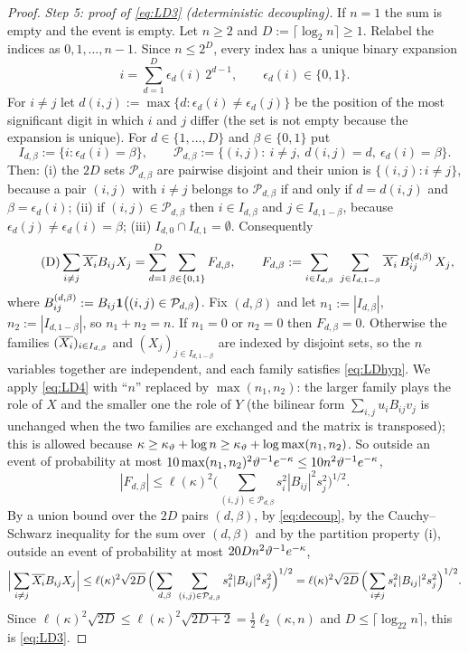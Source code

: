 \begin{proof}
\emph{Step 5: proof of \eqref{eq:LD3} (deterministic decoupling).} If $n=1$ the sum is empty and the event is empty. Let $n\ge2$ and $D:=\lceil\log_2n\rceil\ge1$. Relabel the indices as $0,1,\dots,n-1$. Since $n\le2^D$, every index has a unique binary expansion
\[
 i=\sum_{d=1}^D\epsilon_d(i)\,2^{d-1},\qquad\epsilon_d(i)\in\{0,1\}.
\]
For $i\ne j$ let $d(i,j):=\max\{d:\epsilon_d(i)\ne\epsilon_d(j)\}$ be the position of the most significant digit in which $i$ and $j$ differ (the set is not empty because the expansion is unique).
For $d\in\{1,\dots,D\}$ and $\beta\in\{0,1\}$ put
\[
 I_{d,\beta}:=\{i:\epsilon_d(i)=\beta\},\qquad\mathcal P_{d,\beta}:=\{(i,j):\ i\ne j,\ d(i,j)=d,\ \epsilon_d(i)=\beta\}.
\]
Then: (i) the $2D$ sets $\mathcal P_{d,\beta}$ are pairwise disjoint and their union is $\{(i,j):i\ne j\}$, because a pair $(i,j)$ with $i\ne j$ belongs to $\mathcal P_{d,\beta}$ if and only if $d=d(i,j)$ and $\beta=\epsilon_d(i)$;
(ii) if $(i,j)\in\mathcal P_{d,\beta}$ then $i\in I_{d,\beta}$ and $j\in I_{d,1-\beta}$, because $\epsilon_d(j)\ne\epsilon_d(i)=\beta$; (iii) $I_{d,0}\cap I_{d,1}=\emptyset$. Consequently
\begin{equation}\tag{D}\label{eq:decoup}
 \sum_{i\ne j}\overline{X_i}B_{ij}X_j=\sum_{d=1}^D\sum_{\beta\in\{0,1\}}F_{d,\beta},\qquad F_{d,\beta}:=\sum_{i\in I_{d,\beta}}\ \sum_{j\in I_{d,1-\beta}}\overline{X_i}\,B^{(d,\beta)}_{ij}\,X_j,
\end{equation}
where $B^{(d,\beta)}_{ij}:=B_{ij}\mathbf{1}\big((i,j)\in\mathcal P_{d,\beta}\big)$.
Fix $(d,\beta)$ and let $n_1:=|I_{d,\beta}|$, $n_2:=|I_{d,1-\beta}|$, so $n_1+n_2=n$. If $n_1=0$ or $n_2=0$ then $F_{d,\beta}=0$. Otherwise the families $(\overline{X_i})_{i\in I_{d,\beta}}$ and $(X_j)_{j\in I_{d,1-\beta}}$ are indexed by disjoint sets, so the $n$ variables together are independent,
and each family satisfies \eqref{eq:LDhyp}. We apply \eqref{eq:LD4} with ``$n$'' replaced by $\max(n_1,n_2)$: the larger family plays the role of $X$ and the smaller one the role of $Y$ (the bilinear form $\sum_{i,j}u_iB_{ij}v_j$ is unchanged when the two families are exchanged and the matrix is transposed);
this is allowed because $\kappa\ge\kappa_\vartheta+\log n\ge\kappa_\vartheta+\log\max(n_1,n_2)$. So outside an event of probability at most $10\max(n_1,n_2)^2\vartheta^{-1}e^{-\kappa}\le10n^2\vartheta^{-1}e^{-\kappa}$,
\[
 |F_{d,\beta}|\le\ell(\kappa)^2\Big(\sum_{(i,j)\in\mathcal P_{d,\beta}}s_i^2|B_{ij}|^2s_j^2\Big)^{1/2}.
\]
By a union bound over the $2D$ pairs $(d,\beta)$, by \eqref{eq:decoup}, by the Cauchy--Schwarz inequality for the sum over $(d,\beta)$ and by the partition property (i), outside an event of probability at most $20Dn^2\vartheta^{-1}e^{-\kappa}$,
\[
 \Big|\sum_{i\ne j}\ol{X_i}B_{ij}X_j\Big|\le\ell(\kappa)^2\sqrt{2D}\,\Big(\sum_{d,\beta}\ \sum_{(i,j)\in\mathcal P_{d,\beta}}s_i^2|B_{ij}|^2s_j^2\Big)^{1/2}=\ell(\kappa)^2\sqrt{2D}\,\Big(\sum_{i\ne j}s_i^2|B_{ij}|^2s_j^2\Big)^{1/2}.
\]
Since $\ell(\kappa)^2\sqrt{2D}\le\ell(\kappa)^2\sqrt{2D+2}=\frac12\ell_2(\kappa,n)$ and $D\le\lceil\log_22n\rceil$, this is \eqref{eq:LD3}.


\end{proof}
